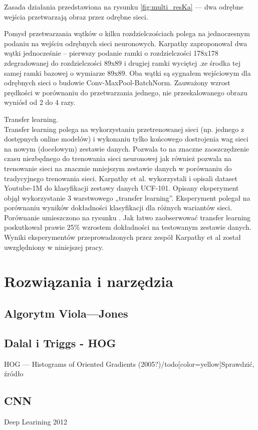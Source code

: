 Zasada działania przedstawiona na rysunku \ref{fig:multi_resKa} --- dwa odrębne wejścia przetwarzają obraz przez odrębne sieci.

Pomysł przetwarzania wątków o kilku rozdzielczościach polega na jednoczesnym podaniu na wejściu odrębnych sieci neuronowych. Karpathy zaproponował dwa wątki jednocześnie – pierwszy podanie ramki o rozdzielczości 178x178 zdegradowanej do rozdzielczości 89x89 i drugiej ramki wyciętej .ze środka tej samej ramki bazowej o wymiarze 89x89. Oba wątki są sygnałem wejściowym dla odrębnych sieci o budowie Conv-MaxPool-BatchNorm. Zauważony wzrost prędkości w porównaniu do przetwarzania jednego, nie przeskalowanego obrazu wyniósł od 2 do 4 razy. 

Transfer learning.\\

Transfer learning polega na wykorzystaniu przetrenowanej sieci (np. jednego z dostępnych online modelów) i wykonaniu tylko końcowego dostrojenia wag sieci na nowym (docelowym) zestawie danych. Pozwala to na znaczne zaoszczędzenie czasu niezbędnego do trenowania sieci neuronowej jak również pozwala na trenowanie sieci na znacznie mniejszym zestawie danych w porównaniu do tradycyjnego trenowania sieci. Karpathy et al. wykorzystali i opisali dataset Youtube-1M do klasyfikacji zestawy danych UCF-101. Opisany eksperyment objął wykorzystanie 3 warstwowego „transfer learning”. Eksperyment polegał na porównaniu wyników dokładności klasyfikacji dla różnych wariantów sieci. Porównanie umieszczono na rysunku {}. Jak łatwo zaobserwować transfer learning poskutkował prawie 25\% wzrostem dokładności na testowanym zestawie danych. Wyniki eksperymentów przeprowadzonych przez zespół Karpathy et al został uwzględniony w niniejszej pracy.


\section{Rozwiązania i narzędzia}
\subsection{Algorytm Viola---Jones}
\subsection{Dalal i Triggs - HOG}
HOG --- Histograms of Oriented Gradients (2005?)/todo[color=yellow]{Sprawdzić, źródło}
\subsection{CNN}
Deep Learining 2012

